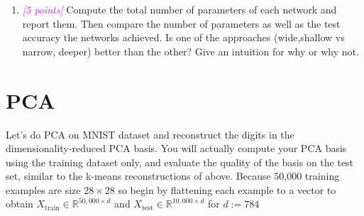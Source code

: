 \documentclass{article}
\newcommand{\field}[1]{\mathbb{#1}}
\newcommand{\1}{\mathbf{1}}
\newcommand{\R}{\field{R}} %
\newcommand{\points}[1]{\small\textcolor{magenta}{\emph{[#1 points]}} \normalsize}
\begin{document}
\begin{enumerate}
     \item \points{5} Compute the total number of parameters of each network and report them. Then compare the number of parameters as well as the test accuracy the networks achieved. Is one of the approaches (wide,shallow vs narrow, deeper) better than the other? Give an intuition for why or why not. 
\end{enumerate}

\newpage





\newpage
\section*{PCA}

Let’s do PCA on MNIST dataset and reconstruct the digits in the dimensionality-reduced PCA basis. You will actually compute your PCA basis using the training dataset only, and evaluate the quality of the basis on the  test set, similar to the k-means reconstructions of above. Because 50,000 training examples are size $28\times 28$ so begin by flattening each example to a vector to obtain $X_{\text{train}} \in \R^{50,000 \times d}$ and $X_{\text{test}} \in \R^{10,000\times d}$ for $d:=784$
\end{document}
